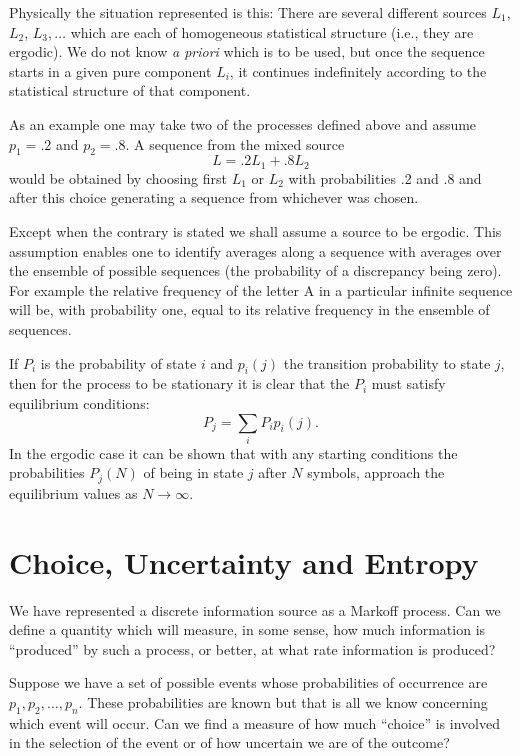 Physically the situation represented is this: There are several different
sources $L_1$, $L_2$, $L_3,\dots$ which are each of homogeneous statistical
structure (i.e., they are ergodic).  We do not know \emph{a priori} which
is to be used, but once the sequence starts in a given pure component
$L_i$, it continues indefinitely according to the statistical structure
of that component.

As an example one may take two of the processes defined above and assume
$p_1 = .2$ and $p_2 = .8$.  A sequence from the mixed source
$$
L=.2 L_1 + .8L_2
$$
would be obtained by choosing first $L_1$ or $L_2$ with probabilities
.2 and .8 and after this choice generating a sequence from whichever
was chosen.

Except when the contrary is stated we shall assume a source to be ergodic.
This assumption enables one to identify averages along a sequence with
averages over the ensemble of possible sequences (the probability of
a discrepancy being zero).  For example the relative frequency of the
letter A in a particular infinite sequence will be, with probability one,
equal to its relative frequency in the ensemble of sequences.

If $P_i$ is the probability of state $i$ and $p_i(j)$ the transition
probability to state $j$, then for the process to be stationary it is
clear that the $P_i$ must satisfy equilibrium conditions:
$$
P_j = \sum_i P_i p_i (j).
$$
In the ergodic case it can be shown that with any starting conditions
the probabilities $P_j(N)$ of being in state $j$ after $N$ symbols,
approach the equilibrium values as $N\to\infty$.

\section{Choice, Uncertainty and Entropy}

We have represented a discrete information source as a Markoff process.
Can we define a quantity which will measure, in some sense, how much
information is ``produced'' by such a process, or better, at what rate
information is produced?

Suppose we have a set of possible events whose probabilities of occurrence
are $p_1,p_2,\dots,p_n$.  These probabilities are known but that is
all we know concerning which event will occur.  Can we find a measure
of how much ``choice'' is involved in the selection of the event or of
how uncertain we are of the outcome?

